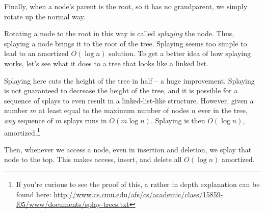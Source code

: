 Finally, when a node's parent is the root, so it has no grandparent, we simply rotate up the normal way.

Rotating a node to the root in this way is called \textit{splaying} the node. Thus, splaying a node brings it to the root of the tree. Splaying seems too simple to lead to an amortized $O(\log{n})$ solution. To get a better idea of how splaying works, let's see what it does to a tree that looks like a linked list.

\begin{center}
\end{center}

Splaying here cuts the height of the tree in half -- a huge improvement. Splaying is not guaranteed to decrease the height of the tree, and it is possible for a sequence of splays to even result in a linked-list-like structure. However, given a number $m$ at least equal to the maximum number of nodes $n$ ever in the tree, \textit{any} sequence of $m$ splays runs in $O(m \log{n})$. Splaying is then $O(\log{n})$, amortized.\footnote{If you're curious to see the proof of this, a rather in depth explanation can be found here: \url{http://www.cs.cmu.edu/afs/cs/academic/class/15859-f05/www/documents/splay-trees.txt}}

Then, whenever we access a node, even in insertion and deletion, we splay that node to the top. This makes access, insert, and delete all $O(\log{n})$ amortized.

